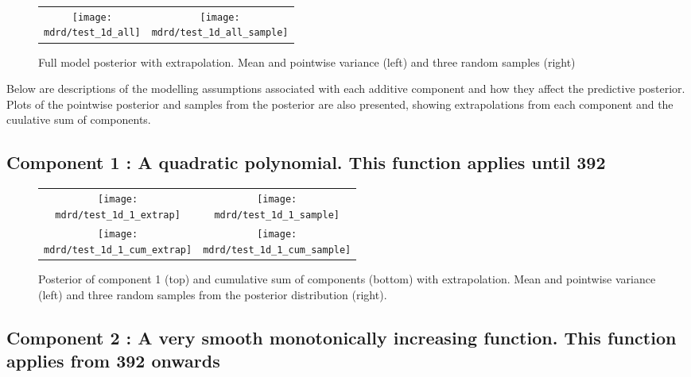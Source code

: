 \documentclass{article} %
\begin{document}
\begin{figure}[H]
\newcommand{\wmgd}{0.5\columnwidth}
\newcommand{\hmgd}{3.0cm}
\newcommand{\mdrd}{test_1d}
\newcommand{\mbm}{\hspace{-0.3cm}}
\begin{tabular}{cc}
\mbm \texttt{[image: \\mdrd/test\_1d\_all]} & \texttt{[image: \\mdrd/test\_1d\_all\_sample]}
\end{tabular}
\caption{Full model posterior with extrapolation. Mean and pointwise variance (left) and three random samples (right)}
\label{fig:extrap}
\end{figure}

Below are descriptions of the modelling assumptions associated with each additive component and how they affect the predictive posterior.
Plots of the pointwise posterior and samples from the posterior are also presented, showing extrapolations from each component and the cuulative sum of components.

\subsection{Component 1 : A quadratic polynomial. This function applies until  392}



\begin{figure}[H]
\newcommand{\wmgd}{0.5\columnwidth}
\newcommand{\hmgd}{3.0cm}
\newcommand{\mdrd}{test_1d}
\newcommand{\mbm}{\hspace{-0.3cm}}
\begin{tabular}{cc}
\mbm \texttt{[image: \\mdrd/test\_1d\_1\_extrap]} & \texttt{[image: \\mdrd/test\_1d\_1\_sample]} \\
\mbm \texttt{[image: \\mdrd/test\_1d\_1\_cum\_extrap]} & \texttt{[image: \\mdrd/test\_1d\_1\_cum\_sample]}
\end{tabular}
\caption{Posterior of component 1 (top) and cumulative sum of components (bottom) with extrapolation. Mean and pointwise variance (left) and three random samples from the posterior distribution (right).}
\label{fig:extrap1}
\end{figure}

\subsection{Component 2 : A very smooth monotonically increasing function. This function applies from  392 onwards}
\end{document}
